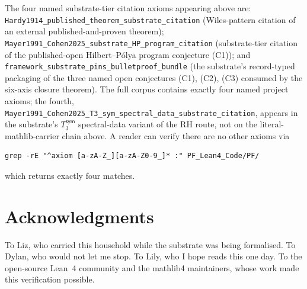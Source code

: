 \documentclass[11pt,a4paper]{amsart}
\theoremstyle{plain}
\theoremstyle{definition}
\begin{document}
The four named substrate-tier citation axioms appearing above are: \texttt{Hardy1914\_published\_theorem\_substrate\_citation} (Wiles-pattern citation of an external published-and-proven theorem); \texttt{Mayer1991\_Cohen2025\_substrate\_HP\_program\_citation} (substrate-tier citation of the published-open Hilbert--P\'olya program conjecture (C1)); and \texttt{framework\_substrate\_pins\_bulletproof\_bundle} (the substrate's record-typed packaging of the three named open conjectures (C1), (C2), (C3) consumed by the six-axis closure theorem). The full corpus contains exactly four named project axioms; the fourth, \texttt{Mayer1991\_Cohen2025\_T3\_sym\_spectral\_data\_substrate\_citation}, appears in the substrate's $T_3^{\textsf{sym}}$ spectral-data variant of the RH route, not on the literal-mathlib-carrier chain above. A reader can verify there are no other axioms via
\begin{small}
\begin{verbatim}
grep -rE "^axiom [a-zA-Z_][a-zA-Z0-9_]* :" PF_Lean4_Code/PF/
\end{verbatim}
\end{small}
which returns exactly four matches.

\section*{Acknowledgments}

To Liz, who carried this household while the substrate was being formalised. To Dylan, who would not let me stop. To Lily, who I hope reads this one day. To the open-source Lean~4 community and the mathlib4 maintainers, whose work made this verification possible.
\end{document}

